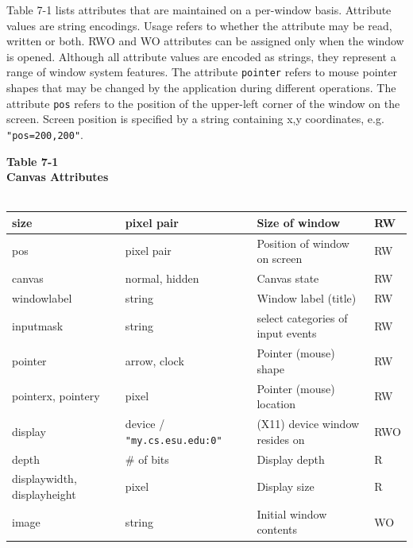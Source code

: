 Table 7-1 lists attributes that are maintained on a per-window basis.
Attribute values are string encodings. Usage refers to whether the
attribute may be read, written or both. RWO and WO attributes can be
assigned only when the window is opened.  Although all attribute
values are encoded as strings, they represent a range of window system
features. The attribute \texttt{pointer} refers to mouse pointer
shapes that may be changed by the application during different
operations. The attribute \texttt{pos} refers to the position of the
upper-left corner of the window on the screen. Screen position is
specified by a string containing x,y coordinates,
e.g. \texttt{"pos=200,200"}.

\pagebreak

\begin{center}
{\sffamily\bfseries Table 7-1} \\
{\sffamily\bfseries Canvas Attributes} \\
\ \\ 
  \begin{supertabular}{|m{1.03in}|m{1.9in}|m{2.24in}|m{0.44835988in}|}
    size & pixel pair & Size of window & RW \\\hline
    pos & pixel pair & Position of window on screen & RW \\\hline
    canvas & normal, hidden & Canvas state & RW\\\hline
    windowlabel & string & Window label (title) & RW \\\hline
    inputmask & string & select categories of input events & RW \\\hline
    pointer & arrow, clock & Pointer (mouse) shape  & RW \\\hline
    pointerx, pointery & pixel & Pointer (mouse) location & RW \\\hline
    display & device / \texttt{"my.cs.esu.edu:0"} & (X11) device window resides on & RWO \\\hline
    depth & \# of bits & Display depth & R \\\hline
    displaywidth, displayheight & pixel & Display size & R \\\hline
    image & string & Initial window contents & WO \\\hline
  \end{supertabular}
\end{center}

